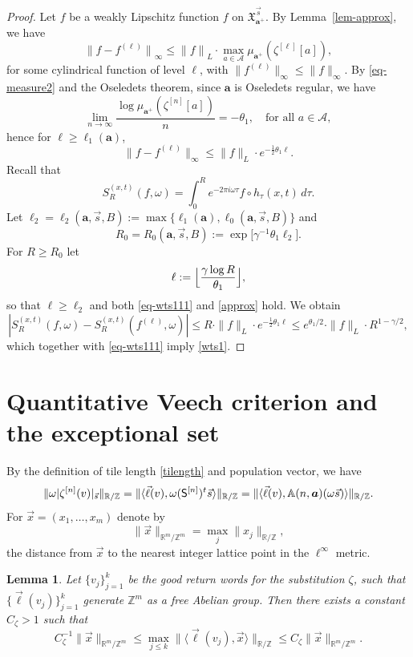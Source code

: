 \documentclass[10pt]{amsart}
\let\mathcal\mathscr
\theoremstyle{plain}
\newtheorem{lemma}[theorem]{Lemma}
\theoremstyle{definition}
\newcommand\half{\frac{1}{2}}
\newcommand\bom{{\boldsymbol a}}\let\ba\bom
\let\gam\gamma
\let\om\omega
\newcommand\Xx{\mathfrak{X}}
\newcommand\Ak{\mathcal{A}}
\newcommand\Aa{\mathbb{A}}
\newcommand{\R}{\mathbb{R}}
\newcommand{\Z}{\mathbb{Z}}
\newcommand\Sf{{\sf S}}
\newcommand\be{\begin{equation}}
\newcommand\ee{\end{equation}}
\begin{document}
\begin{proof}
Let $f$ be a weakly Lipschitz function $f$ on $\Xx_{\bom^+}^{\vec{s}}$.
By Lemma~\ref{lem-approx}, we have
\[
{\|f - f^{(\ell)}\|}_\infty \le {\|f\|}_L\cdot \max_{a\in \Ak} \mu_{\bom^+}(\zeta^{[\ell]}[a]),
\]
for some cylindrical function of level $\ell$, with $\|f^{(\ell)}\|_\infty \le \|f\|_\infty$. By \eqref{eq-measure2} and the Oseledets theorem,
since $\bom$ is Oseledets regular, we have
\[
\lim _{n\to \infty} \frac{\log \mu_{\bom^+}(\zeta^{[n]}[a])}{n} = -\theta_1,\quad \text{for all }a\in \Ak,
\]
hence for $\ell\ge \ell_1(\bom)$,
\be \label{approx}
\|f-f^{(\ell)}\|_\infty \le \|f\|_L\cdot e^{-\half\theta_1\ell}.
\ee
Recall that
\[
S_R^{(x,t)}(f,\om) = \int_0^R e^{-2\pi i \om \tau} f\circ h_\tau(x,t)\,d\tau.
\]
Let $\ell_2=\ell_2(\bom,\vec s,B):= \max\{\ell_1(\bom), \ell_0(\bom,\vec s,B)\}$ and
\[
R_0=R_0(\bom,\vec s,B) := \exp\bigl[\gam^{-1}\theta_1 \ell_2\bigr].
\]
For $R\ge R_0$ let
\be\label{def-ell}
\ell := \Bigl\lfloor \frac{\gam \log R}{\theta_1}\Bigr\rfloor,
\ee
so that $\ell\ge \ell_2$ and both \eqref{eq-wts111} and \eqref{approx} hold. We obtain
\[
|S_R^{(x,t)}(f,\om) - S_R^{(x,t)}(f^{(\ell)},\om)| \le R\cdot \|f\|_L \cdot e^{-\half\theta_1 \ell} \le e^{\theta_1/2}\cdot \|f\|_L\cdot R^{1-\gam/2},
\]
which together with \eqref{eq-wts111} imply \eqref{wts1}.
\end{proof}

\section{Quantitative Veech criterion and the exceptional set}

By the definition of tile length \eqref{tilength} and population vector, we have
\[
\|\om|\zeta^{[n]}(v)|_{\vec{s}}\|_{\R/\Z} = \|\langle \vec\ell(v), \om (\Sf^{[n]})^t \vec{s} \rangle \|_{\R/\Z} = \|\langle \vec\ell(v), \Aa(n,\bom) (\om\vec{s} )\rangle \|_{\R/\Z}.
\]
For $\vec{x} = (x_1,\ldots,x_m)$ denote by
\[
\|\vec{x}\|_{\R^m/\Z^m} = \max_j \|x_j\|_{\R/\Z},
\]
the distance from $\vec x$ to the nearest integer lattice point in the $\ell^\infty$ metric.

\begin{lemma} \label{lem-lattice}
Let $\{v_j\}_{j=1}^k$ be the good return words for the substitution $\zeta$, such that $\{\vec\ell(v_j)\}_{j=1}^k$ generate $\Z^m$ as a free Abelian group. Then there exists a constant
$C_\zeta>1$ such that
\be \label{ineq-lattice}
C_\zeta^{-1} \|\vec x\|_{\R^m/\Z^m}
\le \max_{j\le k} \|\langle \vec\ell(v_j), \vec{x}\rangle \|_{\R/\Z} \le C_\zeta \|\vec x\|_{\R^m/\Z^m}.
\ee
\end{lemma}
\end{document}
